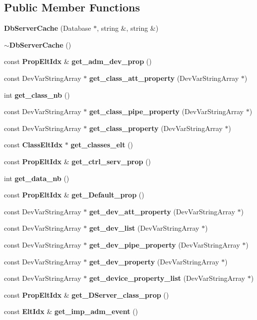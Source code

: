 \subsection*{Public Member Functions}
\begin{DoxyCompactItemize}
\item 
{\bf Db\-Server\-Cache} (Database $\ast$, string \&, string \&)
\item 
{\bf $\sim$\-Db\-Server\-Cache} ()
\item 
const {\bf Prop\-Elt\-Idx} \& {\bf get\-\_\-adm\-\_\-dev\-\_\-prop} ()
\item 
const Dev\-Var\-String\-Array $\ast$ {\bf get\-\_\-class\-\_\-att\-\_\-property} (Dev\-Var\-String\-Array $\ast$)
\item 
int {\bf get\-\_\-class\-\_\-nb} ()
\item 
const Dev\-Var\-String\-Array $\ast$ {\bf get\-\_\-class\-\_\-pipe\-\_\-property} (Dev\-Var\-String\-Array $\ast$)
\item 
const Dev\-Var\-String\-Array $\ast$ {\bf get\-\_\-class\-\_\-property} (Dev\-Var\-String\-Array $\ast$)
\item 
const {\bf Class\-Elt\-Idx} $\ast$ {\bf get\-\_\-classes\-\_\-elt} ()
\item 
const {\bf Prop\-Elt\-Idx} \& {\bf get\-\_\-ctrl\-\_\-serv\-\_\-prop} ()
\item 
int {\bf get\-\_\-data\-\_\-nb} ()
\item 
const {\bf Prop\-Elt\-Idx} \& {\bf get\-\_\-\-Default\-\_\-prop} ()
\item 
const Dev\-Var\-String\-Array $\ast$ {\bf get\-\_\-dev\-\_\-att\-\_\-property} (Dev\-Var\-String\-Array $\ast$)
\item 
const Dev\-Var\-String\-Array $\ast$ {\bf get\-\_\-dev\-\_\-list} (Dev\-Var\-String\-Array $\ast$)
\item 
const Dev\-Var\-String\-Array $\ast$ {\bf get\-\_\-dev\-\_\-pipe\-\_\-property} (Dev\-Var\-String\-Array $\ast$)
\item 
const Dev\-Var\-String\-Array $\ast$ {\bf get\-\_\-dev\-\_\-property} (Dev\-Var\-String\-Array $\ast$)
\item 
const Dev\-Var\-String\-Array $\ast$ {\bf get\-\_\-device\-\_\-property\-\_\-list} (Dev\-Var\-String\-Array $\ast$)
\item 
const {\bf Prop\-Elt\-Idx} \& {\bf get\-\_\-\-D\-Server\-\_\-class\-\_\-prop} ()
\item 
const {\bf Elt\-Idx} \& {\bf get\-\_\-imp\-\_\-adm\-\_\-event} ()
\item 

\end{DoxyCompactItemize}
